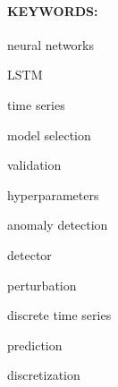 \paragraph{KEYWORDS:}
\begin{itemize*}[label=,itemsep=1em,itemjoin=\hspace{1em}]
  \item neural networks
  \item LSTM
  \item time series
  \item model selection
  \item validation
  \item hyperparameters
  \item anomaly detection
  \item detector
  \item perturbation
  \item discrete time series
  \item prediction
  \item discretization
\end{itemize*}

\endinput
